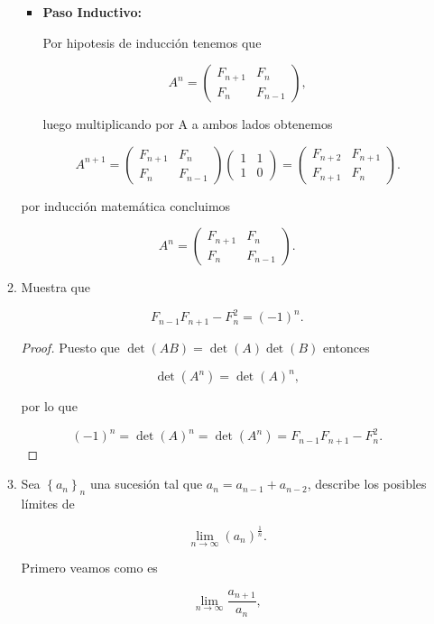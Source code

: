 \documentclass[letterpaper]{article}
\theoremstyle{definition}
\theoremstyle{lemathm}
\theoremstyle{lemademthm}
\newcommand{\limninf}{\lim_{n\to\infty}}
\newcommand{\pars}[1]{\left( #1 \right) }
\newcommand{\set}[1]{\left \{ #1 \right\} }
\newcommand{\1}{\mathbbm{1}}
\begin{document}
\begin{enumerate}
\begin{enumerate}
\begin{itemize}
				\item \textbf{Paso Inductivo:}
				
				Por hipotesis de inducción tenemos que

				\[A^n = \begin{pmatrix}
					F_{n+1} & F_n\\
					F_n & F_{n-1}
				\end{pmatrix},\]

				luego multiplicando por A a ambos lados obtenemos

				\[A^{n+1} = \begin{pmatrix}
					F_{n+1} & F_n\\
					F_n & F_{n-1}
				\end{pmatrix} \begin{pmatrix}
					1 & 1\\
					1 & 0
				\end{pmatrix} = \begin{pmatrix}
					F_{n+2} & F_{n+1}\\
					F_{n+1} & F_n
				\end{pmatrix}.\]
			\end{itemize}

			por inducción matemática concluimos

			\[A^n = \begin{pmatrix}
				F_{n+1} & F_n\\
				F_n & F_{n-1}
			\end{pmatrix}.\]

			\item Muestra que
			
			\[F_{n-1}F_{n+1}-F_n^2 = \pars{-1}^n.\]

			\begin{proof}
				Puesto que $\det(AB) = \det(A)\det(B)$ entonces

				\[\det(A^n) = \det(A)^n,\]

				por lo que

				\[\pars{-1}^n = \det(A)^n = \det(A^n) = F_{n-1}F_{n+1}-F_n^2.\]
			\end{proof}

			\item Sea $\set{a_n}_n$ una sucesión tal que $a_n = a_{n-1} + a_{n-2}$, describe los posibles límites de 
			
			\[\limninf \pars{a_n}^{\frac{1}{n}}.\]

			Primero veamos como es 

			\[\limninf \frac{a_{n+1}}{a_n},\]


\end{enumerate}
\end{enumerate}
\end{document}
